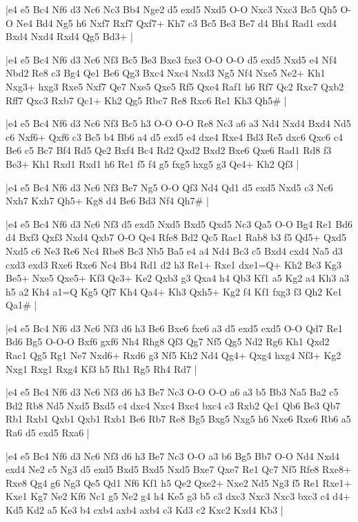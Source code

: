\whitename{}
\blackname{}
\makegametitle
|e4 e5 Bc4 Nf6 d3 Nc6 Nc3 Bb4 Nge2 d5 exd5 Nxd5 O-O Nxc3 Nxc3 Bc5 Qh5 O-O Ne4 Bd4 Ng5 h6 Nxf7 Rxf7 Qxf7+ Kh7 c3 Bc5 Be3 Be7 d4 Bh4 Rad1 exd4 Bxd4 Nxd4 Rxd4 Qg5 Bd3+  |

\whitename{}
\blackname{}
\makegametitle
|e4 e5 Bc4 Nf6 d3 Nc6 Nf3 Bc5 Be3 Bxe3 fxe3 O-O O-O d5 exd5 Nxd5 e4 Nf4 Nbd2 Re8 c3 Bg4 Qe1 Be6 Qg3 Bxc4 Nxc4 Nxd3 Ng5 Nf4 Nxe5 Ne2+ Kh1 Nxg3+ hxg3 Rxe5 Nxf7 Qe7 Nxe5 Qxe5 Rf5 Qxe4 Raf1 h6 Rf7 Qc2 Rxc7 Qxb2 Rff7 Qxc3 Rxb7 Qc1+ Kh2 Qg5 Rbc7 Re8 Rxc6 Re1 Kh3 Qh5\#  |

\whitename{}
\blackname{}
\makegametitle
|e4 e5 Bc4 Nf6 d3 Nc6 Nf3 Bc5 h3 O-O O-O Re8 Nc3 a6 a3 Nd4 Nxd4 Bxd4 Nd5 c6 Nxf6+ Qxf6 c3 Bc5 b4 Bb6 a4 d5 exd5 e4 dxe4 Rxe4 Bd3 Re5 dxc6 Qxc6 c4 Be6 c5 Bc7 Bf4 Rd5 Qe2 Bxf4 Bc4 Rd2 Qxd2 Bxd2 Bxe6 Qxe6 Rad1 Rd8 f3 Be3+ Kh1 Rxd1 Rxd1 h6 Re1 f5 f4 g5 fxg5 hxg5 g3 Qe4+ Kh2 Qf3  |

\whitename{}
\blackname{}
\makegametitle
|e4 e5 Bc4 Nf6 d3 Nc6 Nf3 Be7 Ng5 O-O Qf3 Nd4 Qd1 d5 exd5 Nxd5 c3 Nc6 Nxh7 Kxh7 Qh5+ Kg8 d4 Be6 Bd3 Nf4 Qh7\#  |

\whitename{}
\blackname{}
\makegametitle
|e4 e5 Bc4 Nf6 d3 Nc6 Nf3 d5 exd5 Nxd5 Bxd5 Qxd5 Nc3 Qa5 O-O Bg4 Re1 Bd6 d4 Bxf3 Qxf3 Nxd4 Qxb7 O-O Qe4 Rfe8 Bd2 Qc5 Rac1 Rab8 b3 f5 Qd5+ Qxd5 Nxd5 c6 Ne3 Re6 Nc4 Rbe8 Bc3 Nb5 Ba5 e4 a4 Nd4 Bc3 c5 Bxd4 cxd4 Na5 d3 cxd3 exd3 Rxe6 Rxe6 Nc4 Bb4 Rd1 d2 h3 Re1+ Rxe1 dxe1=Q+ Kh2 Bc3 Kg3 Be5+ Nxe5 Qxe5+ Kf3 Qc3+ Ke2 Qxb3 g3 Qxa4 h4 Qb3 Kf1 a5 Kg2 a4 Kh3 a3 h5 a2 Kh4 a1=Q Kg5 Qf7 Kh4 Qa4+ Kh3 Qxh5+ Kg2 f4 Kf1 fxg3 f3 Qh2 Ke1 Qa1\#  |

\whitename{}
\blackname{}
\makegametitle
|e4 e5 Bc4 Nf6 d3 Nc6 Nf3 d6 h3 Be6 Bxe6 fxe6 a3 d5 exd5 exd5 O-O Qd7 Re1 Bd6 Bg5 O-O-O Bxf6 gxf6 Nh4 Rhg8 Qf3 Qg7 Nf5 Qg5 Nd2 Rg6 Kh1 Qxd2 Rac1 Qg5 Rg1 Ne7 Nxd6+ Rxd6 g3 Nf5 Kh2 Nd4 Qg4+ Qxg4 hxg4 Nf3+ Kg2 Nxg1 Rxg1 Rxg4 Kf3 h5 Rh1 Rg5 Rh4 Rd7  |

\whitename{}
\blackname{}
\makegametitle
|e4 e5 Bc4 Nf6 d3 Nc6 Nf3 d6 h3 Be7 Nc3 O-O O-O a6 a3 b5 Bb3 Na5 Ba2 c5 Bd2 Rb8 Nd5 Nxd5 Bxd5 c4 dxc4 Nxc4 Bxc4 bxc4 c3 Rxb2 Qc1 Qb6 Be3 Qb7 Rb1 Rxb1 Qxb1 Qxb1 Rxb1 Be6 Rb7 Re8 Bg5 Bxg5 Nxg5 h6 Nxe6 Rxe6 Rb6 a5 Ra6 d5 exd5 Rxa6  |

\whitename{}
\blackname{}
\makegametitle
|e4 e5 Bc4 Nf6 d3 Nc6 Nf3 d6 h3 Be7 Nc3 O-O a3 b6 Bg5 Bb7 O-O Nd4 Nxd4 exd4 Ne2 c5 Ng3 d5 exd5 Bxd5 Bxd5 Nxd5 Bxe7 Qxe7 Re1 Qc7 Nf5 Rfe8 Rxe8+ Rxe8 Qg4 g6 Ng3 Qe5 Qd1 Nf6 Kf1 h5 Qe2 Qxe2+ Nxe2 Nd5 Ng3 f5 Re1 Rxe1+ Kxe1 Kg7 Ne2 Kf6 Nc1 g5 Ne2 g4 h4 Ke5 g3 b5 c3 dxc3 Nxc3 Nxc3 bxc3 c4 d4+ Kd5 Kd2 a5 Ke3 b4 cxb4 axb4 axb4 c3 Kd3 c2 Kxc2 Kxd4 Kb3  |

